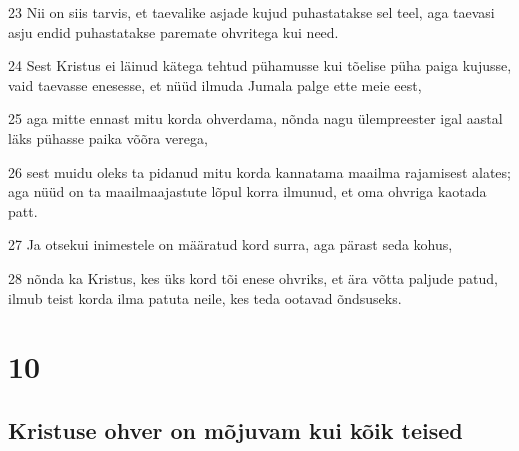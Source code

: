 \par 23 Nii on siis tarvis, et taevalike asjade kujud puhastatakse sel teel, aga taevasi asju endid puhastatakse paremate ohvritega kui need.
\par 24 Sest Kristus ei läinud kätega tehtud pühamusse kui tõelise püha paiga kujusse, vaid taevasse enesesse, et nüüd ilmuda Jumala palge ette meie eest,
\par 25 aga mitte ennast mitu korda ohverdama, nõnda nagu ülempreester igal aastal läks pühasse paika võõra verega,
\par 26 sest muidu oleks ta pidanud mitu korda kannatama maailma rajamisest alates; aga nüüd on ta maailmaajastute lõpul korra ilmunud, et oma ohvriga kaotada patt.
\par 27 Ja otsekui inimestele on määratud kord surra, aga pärast seda kohus,
\par 28 nõnda ka Kristus, kes üks kord tõi enese ohvriks, et ära võtta paljude patud, ilmub teist korda ilma patuta neile, kes teda ootavad õndsuseks.


\chapter{10}

\section*{Kristuse ohver on mõjuvam kui kõik teised}

